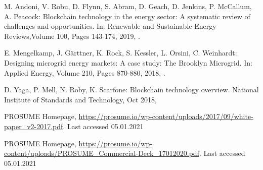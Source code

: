 \documentclass[runningheads]{llncs}
\begin{document}
\begin{thebibliography}{8}
M. Andoni, V. Robu, D. Flynn, S. Abram, D. Geach, D. Jenkins, P. McCallum, A. Peacock:
Blockchain technology in the energy sector: A systematic review of challenges and opportunities. In: Renewable and Sustainable Energy Reviews,Volume 100, Pages 143-174, 2019, .

E. Mengelkamp, J. Gärttner, K. Rock, S. Kessler, L. Orsini, C. Weinhardt: Designing microgrid energy markets: A case study: The Brooklyn Microgrid. In: Applied Energy, Volume 210, Pages 870-880, 2018, .

D. Yaga, P. Mell, N. Roby, K. Scarfone: Blockchain technology overview. National Institute of Standards and Technology, Oct 2018, 

PROSUME Homepage, \url{https://prosume.io/wp-content/uploads/2017/09/white-paper\_v2-2017.pdf}. Last accessed 05.01.2021

PROSUME Homepage, \url{https://prosume.io/wp-content/uploads/PROSUME\_Commercial-Deck\_17012020.pdf}. Last accessed 05.01.2021

\end{thebibliography}
\end{document}
